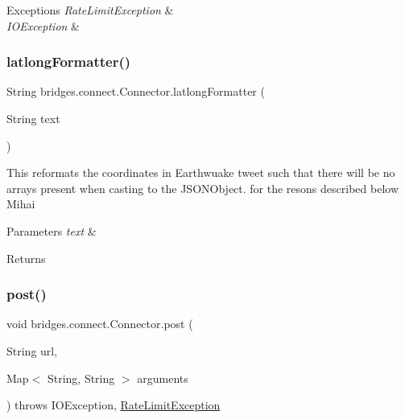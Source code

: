 \begin{DoxyExceptions}{Exceptions}
{\em Rate\+Limit\+Exception} & \\
\hline
{\em I\+O\+Exception} & \\
\hline
\end{DoxyExceptions}
\hypertarget{classbridges_1_1connect_1_1_connector_a2318cd93d18ef58285598f6f9cdf727b}{}\label{classbridges_1_1connect_1_1_connector_a2318cd93d18ef58285598f6f9cdf727b} 
\subsubsection{\texorpdfstring{latlong\+Formatter()}{latlongFormatter()}}
{\footnotesize\ttfamily String bridges.\+connect.\+Connector.\+latlong\+Formatter (\begin{DoxyParamCaption}\item[{String}]{text }\end{DoxyParamCaption})}

This reformats the coordinates in Earthwuake tweet such that there will be no arrays present when casting to the J\+S\+O\+N\+Object. for the resons described below Mihai 
\begin{DoxyParams}{Parameters}
{\em text} & \\
\hline
\end{DoxyParams}
\begin{DoxyReturn}{Returns}

\end{DoxyReturn}
\hypertarget{classbridges_1_1connect_1_1_connector_a95fdd8c6455e49dbdf15f9ae8594ce23}{}\label{classbridges_1_1connect_1_1_connector_a95fdd8c6455e49dbdf15f9ae8594ce23} 
\subsubsection{\texorpdfstring{post()}{post()}\hspace{0.1cm}{\footnotesize\ttfamily [1/2]}}
{\footnotesize\ttfamily void bridges.\+connect.\+Connector.\+post (\begin{DoxyParamCaption}\item[{String}]{url,  }\item[{Map$<$ String, String $>$}]{arguments }\end{DoxyParamCaption}) throws I\+O\+Exception, \hyperlink{classbridges_1_1validation_1_1_rate_limit_exception}{Rate\+Limit\+Exception}}

